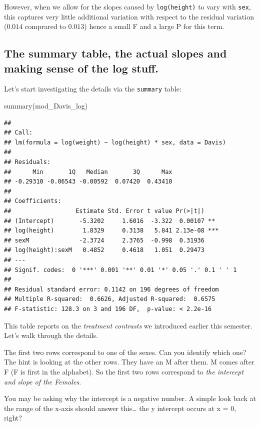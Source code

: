 \documentclass[
]{book}
\newenvironment{Shaded}{\begin{snugshade}}{\end{snugshade}}
\newcommand{\FunctionTok}[1]{\textcolor[rgb]{0.00,0.00,0.00}{#1}}
\newcommand{\NormalTok}[1]{#1}
\begin{document}
However, when we allow for the slopes caused by \texttt{log(height)} to vary with \texttt{sex}, this captures very little additional variation with respect to the residual variation (\(0.014\) comprared to \(0.013\)) hence a small F and a large P for this term.

\hypertarget{the-summary-table-the-actual-slopes-and-making-sense-of-the-log-stuff.}{%
\subsection{The summary table, the actual slopes and making sense of the log stuff.}\label{the-summary-table-the-actual-slopes-and-making-sense-of-the-log-stuff.}}

Let's start investigating the details via the \texttt{summary} table:

\begin{Shaded}
\begin{Highlighting}[]
\FunctionTok{summary}\NormalTok{(mod\_Davis\_log)}
\end{Highlighting}
\end{Shaded}

\begin{verbatim}
## 
## Call:
## lm(formula = log(weight) ~ log(height) * sex, data = Davis)
## 
## Residuals:
##      Min       1Q   Median       3Q      Max 
## -0.29310 -0.06543 -0.00592  0.07420  0.43410 
## 
## Coefficients:
##                  Estimate Std. Error t value Pr(>|t|)    
## (Intercept)       -5.3202     1.6016  -3.322  0.00107 ** 
## log(height)        1.8329     0.3138   5.841 2.13e-08 ***
## sexM              -2.3724     2.3765  -0.998  0.31936    
## log(height):sexM   0.4852     0.4618   1.051  0.29473    
## ---
## Signif. codes:  0 '***' 0.001 '**' 0.01 '*' 0.05 '.' 0.1 ' ' 1
## 
## Residual standard error: 0.1142 on 196 degrees of freedom
## Multiple R-squared:  0.6626, Adjusted R-squared:  0.6575 
## F-statistic: 128.3 on 3 and 196 DF,  p-value: < 2.2e-16
\end{verbatim}

This table reports on the \emph{treatment contrasts} we introduced earlier this semester. Let's walk through the details.

The first two rows correspond to one of the sexes. Can you identify which one? The hint is looking at the other rows. They have an M after them. M comes after F (F is first in the alphabet). So the first two rows correspond to \emph{the intercept and slope of the Females}.

You may be asking why the intercept is a negative number. A simple look back at the range of the x-axis should answer this\ldots{} the y intercept occurs at x = 0, right?
\end{document}
